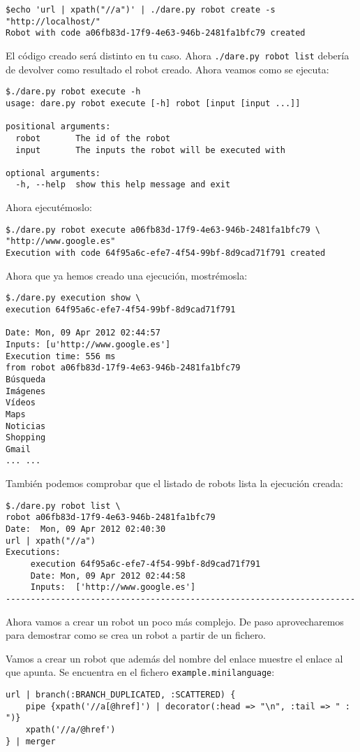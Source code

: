 \begin{verbatim}
$echo 'url | xpath("//a")' | ./dare.py robot create -s "http://localhost/"
Robot with code a06fb83d-17f9-4e63-946b-2481fa1bfc79 created
\end{verbatim}
El código creado será distinto en tu caso.
Ahora \verb+./dare.py robot list+ debería de devolver como resultado
el robot creado.
Ahora veamos como se ejecuta:
\begin{verbatim}
$./dare.py robot execute -h
usage: dare.py robot execute [-h] robot [input [input ...]]

positional arguments:
  robot       The id of the robot
  input       The inputs the robot will be executed with

optional arguments:
  -h, --help  show this help message and exit
\end{verbatim}
Ahora ejecutémoslo:
\begin{verbatim}
$./dare.py robot execute a06fb83d-17f9-4e63-946b-2481fa1bfc79 \
"http://www.google.es"
Execution with code 64f95a6c-efe7-4f54-99bf-8d9cad71f791 created
\end{verbatim}

Ahora que ya hemos creado una ejecución, mostrémosla:

\begin{verbatim}
$./dare.py execution show \
execution 64f95a6c-efe7-4f54-99bf-8d9cad71f791

Date: Mon, 09 Apr 2012 02:44:57
Inputs: [u'http://www.google.es']
Execution time: 556 ms
from robot a06fb83d-17f9-4e63-946b-2481fa1bfc79
Búsqueda
Imágenes
Vídeos
Maps
Noticias
Shopping
Gmail
... ...
\end{verbatim}
También podemos comprobar que el listado de robots lista la ejecución
creada:

\begin{verbatim}
$./dare.py robot list \
robot a06fb83d-17f9-4e63-946b-2481fa1bfc79
Date:  Mon, 09 Apr 2012 02:40:30
url | xpath("//a")
Executions:
     execution 64f95a6c-efe7-4f54-99bf-8d9cad71f791
     Date: Mon, 09 Apr 2012 02:44:58
     Inputs:  ['http://www.google.es']
----------------------------------------------------------------------
\end{verbatim}
Ahora vamos a crear un robot un poco más complejo. De paso
aprovecharemos para demostrar como se crea un robot a partir de un
fichero.

Vamos a crear un robot que además del nombre del enlace muestre el
enlace al que apunta. Se encuentra en el fichero
\verb+example.minilanguage+:
\begin{verbatim}
url | branch(:BRANCH_DUPLICATED, :SCATTERED) {
    pipe {xpath('//a[@href]') | decorator(:head => "\n", :tail => " : ")}
    xpath('//a/@href')
} | merger
\end{verbatim}

